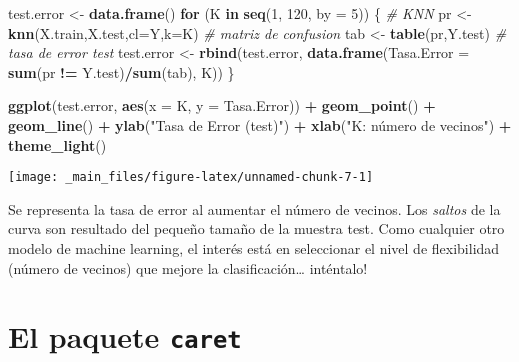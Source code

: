 \documentclass[]{book}
\newenvironment{Shaded}{\begin{snugshade}}{\end{snugshade}}
\newcommand{\CommentTok}[1]{\textcolor[rgb]{0.56,0.35,0.01}{\textit{#1}}}
\newcommand{\ControlFlowTok}[1]{\textcolor[rgb]{0.13,0.29,0.53}{\textbf{#1}}}
\newcommand{\DataTypeTok}[1]{\textcolor[rgb]{0.13,0.29,0.53}{#1}}
\newcommand{\DecValTok}[1]{\textcolor[rgb]{0.00,0.00,0.81}{#1}}
\newcommand{\KeywordTok}[1]{\textcolor[rgb]{0.13,0.29,0.53}{\textbf{#1}}}
\newcommand{\NormalTok}[1]{#1}
\newcommand{\OperatorTok}[1]{\textcolor[rgb]{0.81,0.36,0.00}{\textbf{#1}}}
\newcommand{\StringTok}[1]{\textcolor[rgb]{0.31,0.60,0.02}{#1}}
\begin{document}
\begin{Shaded}
\begin{Highlighting}[]
\NormalTok{test.error <-}\StringTok{ }\KeywordTok{data.frame}\NormalTok{()}
\ControlFlowTok{for}\NormalTok{ (K }\ControlFlowTok{in} \KeywordTok{seq}\NormalTok{(}\DecValTok{1}\NormalTok{, }\DecValTok{120}\NormalTok{, }\DataTypeTok{by =} \DecValTok{5}\NormalTok{)) \{}
  \CommentTok{# KNN}
\NormalTok{  pr <-}\StringTok{ }\KeywordTok{knn}\NormalTok{(X.train,X.test,}\DataTypeTok{cl=}\NormalTok{Y,}\DataTypeTok{k=}\NormalTok{K)}
  \CommentTok{# matriz de confusion}
\NormalTok{  tab <-}\StringTok{ }\KeywordTok{table}\NormalTok{(pr,Y.test)}
  \CommentTok{# tasa de error test}
\NormalTok{  test.error <-}\StringTok{ }\KeywordTok{rbind}\NormalTok{(test.error, }
                        \KeywordTok{data.frame}\NormalTok{(}\DataTypeTok{Tasa.Error =} \KeywordTok{sum}\NormalTok{(pr }\OperatorTok{!=}\StringTok{ }\NormalTok{Y.test)}\OperatorTok{/}\KeywordTok{sum}\NormalTok{(tab), K))}
\NormalTok{\}}

\KeywordTok{ggplot}\NormalTok{(test.error, }\KeywordTok{aes}\NormalTok{(}\DataTypeTok{x =}\NormalTok{ K, }\DataTypeTok{y =}\NormalTok{ Tasa.Error)) }\OperatorTok{+}\StringTok{ }
\StringTok{  }\KeywordTok{geom_point}\NormalTok{() }\OperatorTok{+}\StringTok{ }
\StringTok{  }\KeywordTok{geom_line}\NormalTok{() }\OperatorTok{+}\StringTok{ }
\StringTok{  }\KeywordTok{ylab}\NormalTok{(}\StringTok{"Tasa de Error (test)"}\NormalTok{) }\OperatorTok{+}\StringTok{  }\KeywordTok{xlab}\NormalTok{(}\StringTok{"K: número de vecinos"}\NormalTok{) }\OperatorTok{+}\StringTok{ }
\StringTok{  }\KeywordTok{theme_light}\NormalTok{()}
\end{Highlighting}
\end{Shaded}

\begin{center}\texttt{[image: \_main\_files/figure-latex/unnamed-chunk-7-1]} \end{center}

Se representa la tasa de error al aumentar el número de vecinos. Los \emph{saltos} de la curva son resultado del pequeño tamaño de la muestra test. Como cualquier otro modelo de machine learning, el interés está en seleccionar el nivel de flexibilidad (número de vecinos) que mejore la clasificación\ldots{} inténtalo!

\hypertarget{el-paquete-caret}{%
\section{\texorpdfstring{El paquete \texttt{caret}}{El paquete caret}}\label{el-paquete-caret}}
\end{document}
